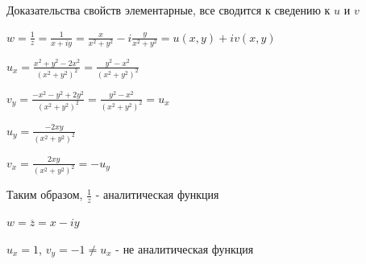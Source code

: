 \documentclass[12pt]{article}
\begin{document}
\Nota Доказательства свойств элементарные, все сводится к сведению к $u$ и $v$

\Ex $w = \frac{1}{z} = \frac{1}{x + iy} = \frac{x}{x^2 + y^2} - i \frac{y}{x^2 + y^2} = u(x, y) + i v(x, y)$

$u_x = \frac{x^2 + y^2 - 2x^2}{(x^2 + y^2)^2} = \frac{y^2 - x^2}{(x^2 + y^2)^2}$

$v_y = \frac{-x^2 - y^2 + 2y^2}{(x^2 + y^2)^2} = \frac{y^2 - x^2}{(x^2 + y^2)^2} = u_x$

$u_y = \frac{-2xy}{(x^2 + y^2)^2}$

$v_x = \frac{2xy}{(x^2 + y^2)^2} = -u_y$

Таким образом, $\frac{1}{z}$ - аналитическая функция

\Ex $w = \overline{z} = x - iy$

$u_x = 1$, $v_y = -1 \neq u_x$ - не аналитическая функция




\end{document}
